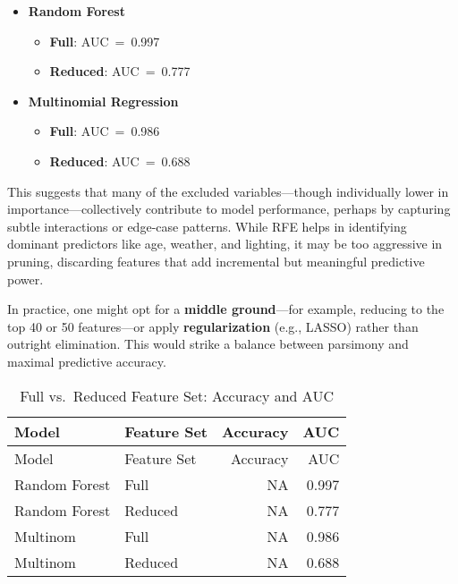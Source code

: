 \documentclass[
]{article}
\providecommand{\tightlist}{%
  \setlength{\itemsep}{0pt}\setlength{\parskip}{0pt}}
\begin{document}
\begin{itemize}
\tightlist
\item
  \textbf{Random Forest}

  \begin{itemize}
  \tightlist
  \item
    \textbf{Full}: AUC~=~0.997\\
  \item
    \textbf{Reduced}: AUC~=~0.777\\
  \end{itemize}
\item
  \textbf{Multinomial Regression}

  \begin{itemize}
  \tightlist
  \item
    \textbf{Full}: AUC~=~0.986\\
  \item
    \textbf{Reduced}: AUC~=~0.688
  \end{itemize}
\end{itemize}

This suggests that many of the excluded variables---though individually
lower in importance---collectively contribute to model performance,
perhaps by capturing subtle interactions or edge‑case patterns. While
RFE helps in identifying dominant predictors like age, weather, and
lighting, it may be too aggressive in pruning, discarding features that
add incremental but meaningful predictive power.

In practice, one might opt for a \textbf{middle ground}---for example,
reducing to the top 40 or 50 features---or apply \textbf{regularization}
(e.g., LASSO) rather than outright elimination. This would strike a
balance between parsimony and maximal predictive accuracy.

\begin{longtable}[]{@{}llrr@{}}
\caption{Full vs.~Reduced Feature Set: Accuracy and AUC}\tabularnewline
\toprule\noalign{}
Model & Feature Set & Accuracy & AUC \\
\midrule\noalign{}
\endfirsthead
\toprule\noalign{}
Model & Feature Set & Accuracy & AUC \\
\midrule\noalign{}
\endhead
\bottomrule\noalign{}
\endlastfoot
Random Forest & Full & NA & 0.997 \\
Random Forest & Reduced & NA & 0.777 \\
Multinom & Full & NA & 0.986 \\
Multinom & Reduced & NA & 0.688 \\
\end{longtable}
\end{document}
